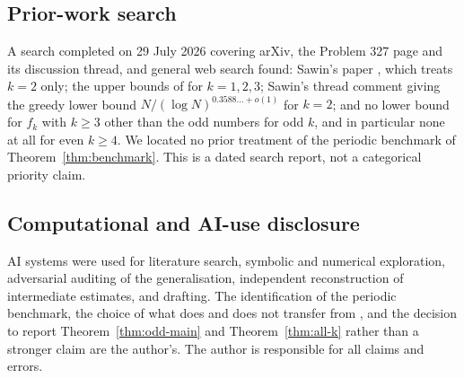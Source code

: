 \documentclass[11pt]{article}
\begin{document}
\subsection{Prior-work search}

A search completed on 29 July 2026 covering arXiv, the Problem 327 page and
its discussion thread, and general web search found: Sawin's paper
\cite{Sawin2026}, which treats \(k=2\) only; the upper bounds of
\cite{Leon2026} for \(k=1,2,3\); Sawin's thread comment giving the greedy
lower bound \(N/(\log N)^{0.3588\ldots+o(1)}\) for \(k=2\); and no lower
bound for \(f_k\) with \(k\geq3\) other than the odd numbers for odd \(k\),
and in particular none at all for even \(k\geq4\). We located no prior
treatment of the periodic benchmark of Theorem~\ref{thm:benchmark}. This is a dated search
report, not a categorical priority claim.

\subsection{Computational and AI-use disclosure}

AI systems were used for literature search, symbolic and numerical
exploration, adversarial auditing of the generalisation, independent
reconstruction of intermediate estimates, and drafting. The identification
of the periodic benchmark, the choice of what does and does not transfer from
\cite{DellaPietra2026}, and the decision to report Theorem~\ref{thm:odd-main} and
Theorem~\ref{thm:all-k} rather than a stronger claim are the author's. The author is
responsible for all claims and errors.



\end{document}
